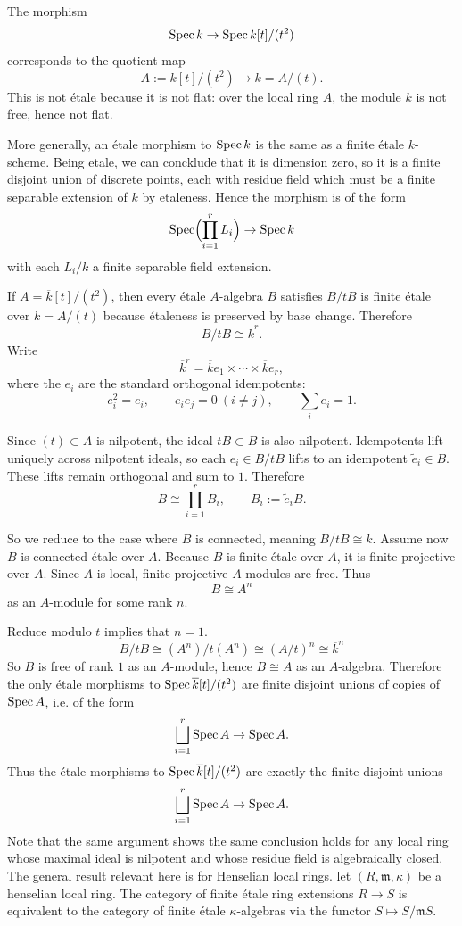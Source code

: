 \documentclass[12pt]{article}
\begin{document}
\begin{solution}
    The morphism
    \[
        \operatorname{Spec} k \to \operatorname{Spec} k[t]/(t^2)
    \]
    corresponds to the quotient map
    \[
        A:=k[t]/(t^2)\to k=A/(t).
    \]
    This is not étale because it is not flat: over the local ring $A$, the module $k$ is not free, hence not flat.

    More generally, an étale morphism to $\operatorname{Spec} k$ is the same as a finite étale $k$-scheme. Being etale, we can concklude that it is dimension zero, so it is a finite disjoint union of discrete points, each with residue field which must be a finite separable extension of $k$ by etaleness. Hence the morphism is of the form
    \[
        \operatorname{Spec}\Bigl(\prod_{i=1}^r L_i\Bigr)\to \operatorname{Spec} k
    \]
    with each $L_i/k$ a finite separable field extension.

    If $A=\overline{k}[t]/(t^2)$, then every étale $A$-algebra $B$ satisfies $B/tB$ is
    finite étale over $\overline{k} = A/(t)$ because étaleness is preserved by base change. Therefore
    \[
        B/tB\cong \overline{k}^r.
    \]
    Write
    \[
        \overline{k}^r=\overline{k}e_1\times\cdots\times \overline{k}e_r,
    \]
    where the \(e_i\) are the standard orthogonal idempotents:
    \[
        e_i^2=e_i,\qquad e_ie_j=0\ (i\neq j),\qquad \sum_i e_i=1.
    \]

    Since \((t)\subset A\) is nilpotent, the ideal \(tB\subset B\) is also nilpotent. Idempotents lift uniquely across nilpotent ideals, so each \(e_i\in B/tB\) lifts to an idempotent \(\widetilde e_i\in B\). These lifts remain orthogonal and sum to \(1\). Therefore
    \[
        B \cong \prod_{i=1}^r B_i,\qquad B_i:=\widetilde e_iB.
    \]

    So we reduce to the case where \(B\) is connected, meaning \(B/tB\cong \overline{k}\). Assume now \(B\) is connected étale over \(A\). Because \(B\) is finite étale over \(A\), it is finite projective over \(A\). Since \(A\) is local, finite projective \(A\)-modules are free. Thus
    \[
        B\cong A^n
    \]
    as an \(A\)-module for some rank \(n\).

    Reduce modulo $t$ implies that $n=1$.
    \[
        B/tB \cong (A^n)/t(A^n)\cong (A/t)^n\cong \overline{k}^n
    \]
    So \(B\) is free of rank \(1\) as an \(A\)-module, hence \(B\cong A\) as an \(A\)-algebra. Therefore the only étale morphisms to \(\operatorname{Spec} \overline{k}[t]/(t^2)\) are finite disjoint unions of copies of \(\operatorname{Spec} A\), i.e. of the form
    \[
        \bigsqcup_{i=1}^r \operatorname{Spec} A \to \operatorname{Spec} A.
    \]
    Thus the étale morphisms to $\operatorname{Spec} \overline{k}[t]/(t^2)$ are exactly the finite disjoint unions
    \[
        \bigsqcup_{i=1}^r \operatorname{Spec} A \to \operatorname{Spec} A.
    \]
    Note that the same argument shows the same conclusion holds for any local ring whose maximal ideal is nilpotent and whose residue field is algebraically closed. The general result relevant here is for Henselian local rings. let $(R,\mathfrak{m},\kappa)$ be a henselian local ring. The category of finite étale ring extensions $R\to S$ is equivalent to the category of finite étale $\kappa$-algebras via the functor $S\mapsto S/\mathfrak{m}S$.


\end{solution}
\end{document}
